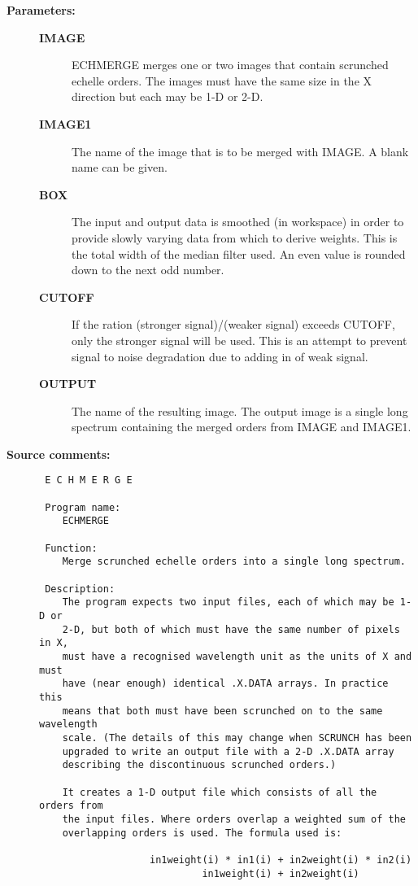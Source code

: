 \begin{description}
\item [{\bf Parameters:}]
\begin{description}
\item [{\bf IMAGE}]
 ECHMERGE merges one or two images that contain scrunched
 echelle orders. The images must have the same size in the
 X direction but each may be 1-D or 2-D.
\item [{\bf IMAGE1}]
 The name of the image that is to be merged with IMAGE.
 A blank name can be given.
\item [{\bf BOX}]
 The input and output data is smoothed (in workspace) in
 order to provide slowly varying data from which to derive
 weights. This is the total width of the median filter used.
 An even value is rounded down to the next odd number.
\item [{\bf CUTOFF}]
 If the ration (stronger signal)/(weaker signal) exceeds
 CUTOFF, only the stronger signal will be used. This is
 an attempt to prevent signal to noise degradation due to
 adding in of weak signal.
\item [{\bf OUTPUT}]
 The name of the resulting image. The output image is a
 single long spectrum containing the merged orders from
 IMAGE and IMAGE1.
\end{description}

\item [{\bf Source comments:}]
\begin{verbatim}
 E C H M E R G E

 Program name:
    ECHMERGE

 Function:
    Merge scrunched echelle orders into a single long spectrum.

 Description:
    The program expects two input files, each of which may be 1-D or
    2-D, but both of which must have the same number of pixels in X,
    must have a recognised wavelength unit as the units of X and must
    have (near enough) identical .X.DATA arrays. In practice this
    means that both must have been scrunched on to the same wavelength
    scale. (The details of this may change when SCRUNCH has been
    upgraded to write an output file with a 2-D .X.DATA array
    describing the discontinuous scrunched orders.)

    It creates a 1-D output file which consists of all the orders from
    the input files. Where orders overlap a weighted sum of the
    overlapping orders is used. The formula used is:

                   in1weight(i) * in1(i) + in2weight(i) * in2(i)
                            in1weight(i) + in2weight(i)


\end{verbatim}
\end{description}

